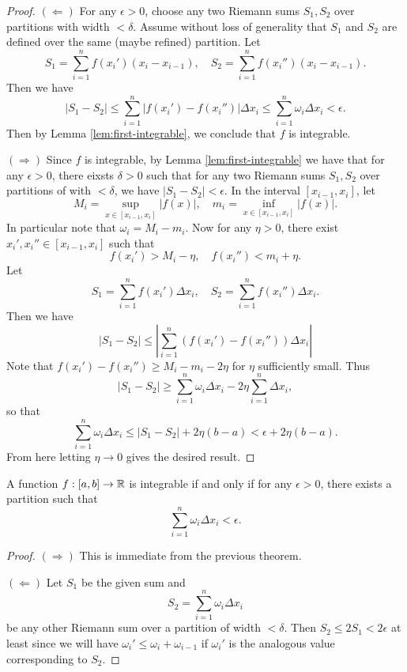 \begin{proof}
  $(\Leftarrow)$ For any $\epsilon > 0$, choose any
  two Riemann sums $S_1, S_2$ over partitions with
  width $< \delta$. Assume without loss of generality
  that $S_1$ and $S_2$ are defined over the same
  (maybe refined) partition. Let
  \[
    S_1 = \sum_{i = 1}^n f(x_i') (x_i - x_{i - 1}),
    \quad
    S_2 = \sum_{i = 1}^n f(x_i'') (x_i - x_{i - 1}).
  \]
  Then we have
  \[
    |S_1 - S_2| \le \sum_{i = 1}^n |f(x_i') - f(x_i'')| \Delta x_i
    \le \sum_{i = 1}^n \omega_i \Delta x_i < \epsilon.
  \]
  Then by Lemma \ref{lem:first-integrable}, we conclude
  that $f$ is integrable.

  $(\Rightarrow)$ Since $f$ is integrable, by Lemma
  \ref{lem:first-integrable} we have that for any
  $\epsilon > 0$, there eixsts $\delta > 0$ such that
  for any two Riemann sums $S_1, S_2$ over partitions
  of with $< \delta$, we have $|S_1 - S_2| < \epsilon$.
  In the interval $[x_{i - 1}, x_i]$, let
  \[
    M_i = \sup_{x \in [x_{i - 1}, x_i]} |f(x)|, \quad
    m_i = \inf_{x \in [x_{i - 1}, x_i]} |f(x)|.
  \]
  In particular note that $\omega_i = M_i - m_i$.
  Now for any $\eta > 0$, there exist
  $x_i', x_i'' \in [x_{i - 1}, x_i]$ such that
  \[
    f(x_i') > M_i - \eta, \quad f(x_i'') < m_i + \eta.
  \]
  Let
  \[
    S_1 = \sum_{i = 1}^n f(x_i') \Delta x_i,
    \quad
    S_2 = \sum_{i = 1}^n f(x_i'') \Delta x_i.
  \]
  Then we have
  \[
    |S_1 - S_2| \le \left| \sum_{i = 1}^n (f(x_i') - f(x_i'')) \Delta x_i \right|
  \]
  Note that $f(x_i') - f(x_i'') \ge M_i - m_i - 2\eta$
  for $\eta$ sufficiently small. Thus
  \[
    |S_1 - S_2| \ge \sum_{i = 1}^n \omega_i \Delta x_i
    - 2\eta \sum_{i = 1}^n \Delta x_i,
  \]
  so that
  \[
    \sum_{i = 1}^n \omega_i \Delta x_i
    \le |S_1 - S_2| + 2\eta (b - a)
    < \epsilon + 2\eta (b - a).
  \]
  From here letting $\eta \to 0$ gives the desired result.
\end{proof}

\begin{theorem}
  A function $f : [a, b] \to \mathbb{R}$ is integrable if and only
  if for any $\epsilon > 0$, there exists a partition
  such that
  \[
    \sum_{i = 1}^n \omega_i \Delta x_i < \epsilon.
  \]
\end{theorem}

\begin{proof}
  $(\Rightarrow)$ This is immediate from the
  previous theorem.

  $(\Leftarrow)$ Let $S_1$ be the given sum
  and
  \[
    S_2 = \sum_{i = 1}^n \omega_i \Delta x_i
  \]
  be any other Riemann sum over a partition of
  width $< \delta$. Then $S_2 \le 2S_1 < 2\epsilon$ at
  least since we will have
  $\omega_i' \le \omega_i + \omega_{i - 1}$ if $\omega_i'$
  is the analogous value corresponding to $S_2$.
\end{proof}
